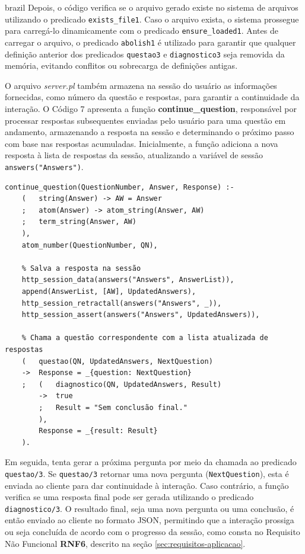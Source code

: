 \begin{otherlanguage*}{brazil}
Depois, o código verifica se o arquivo gerado existe no sistema de arquivos utilizando o predicado \texttt{exists\_file\/1}. Caso o arquivo exista, o sistema prossegue para carregá-lo dinamicamente com o predicado \texttt{ensure\_loaded\/1}. Antes de carregar o arquivo, o predicado \texttt{abolish\/1} é utilizado para garantir que qualquer definição anterior dos predicados \texttt{questao\/3} e \texttt{diagnostico\/3} seja removida da memória, evitando conflitos ou sobrecarga de definições antigas.


O arquivo \textit{server.pl} também armazena na sessão do usuário as informações fornecidas, como número da questão e respostas, para garantir a continuidade da interação. O Código 7 apresenta a função \textbf{continue\_question}, responsável por processar respostas subsequentes enviadas pelo usuário para uma questão em andamento, armazenando a resposta na sessão e determinando o próximo passo com base nas respostas acumuladas. Inicialmente, a função adiciona a nova resposta à lista de respostas da sessão, atualizando a variável de sessão \texttt{answers("Answers")}. 

\begin{lstlisting}[style=ufscthesisx_style, caption={Arquivo \textit{server.pl} - \textit{Handlers} e Manipuladores de requisições}]
continue_question(QuestionNumber, Answer, Response) :-
    (   string(Answer) -> AW = Answer
    ;   atom(Answer) -> atom_string(Answer, AW)
    ;   term_string(Answer, AW)
    ),
    atom_number(QuestionNumber, QN), 

    % Salva a resposta na sessão
    http_session_data(answers("Answers", AnswerList)),
    append(AnswerList, [AW], UpdatedAnswers),
    http_session_retractall(answers("Answers", _)),
    http_session_assert(answers("Answers", UpdatedAnswers)),

    % Chama a questão correspondente com a lista atualizada de respostas
    (   questao(QN, UpdatedAnswers, NextQuestion)
    ->  Response = _{question: NextQuestion}
    ;   (   diagnostico(QN, UpdatedAnswers, Result)
        ->  true
        ;   Result = "Sem conclusão final."
        ),
        Response = _{result: Result}
    ).
\end{lstlisting}

Em seguida, tenta gerar a próxima pergunta por meio da chamada ao predicado \texttt{questao/3}. Se \texttt{questao/3} retornar uma nova pergunta (\texttt{NextQuestion}), esta é enviada ao cliente para dar continuidade à interação. Caso contrário, a função verifica se uma resposta final pode ser gerada utilizando o predicado \texttt{diagnostico/3}. O resultado final, seja uma nova pergunta ou uma conclusão, é então enviado ao cliente no formato JSON, permitindo que a interação prossiga ou seja concluída de acordo com o progresso da sessão, como consta no Requisito Não Funcional \textbf{RNF6}, descrito na seção \ref{sec:requisitos-aplicacao}.


\end{otherlanguage*}
